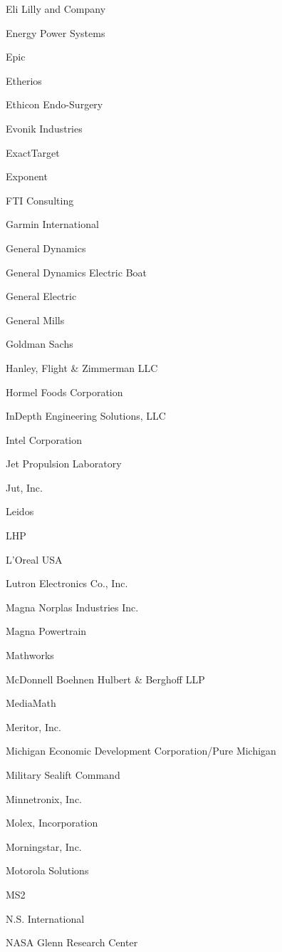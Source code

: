 \documentclass[twoside]{article}
\begin{document}
\begin{center}
\begin{multicols}{5}
\begin{FlushLeft}
\begin{compactitem}
\item Eli Lilly and Company
\item Energy Power Systems
\item Epic
\item Etherios
\item Ethicon Endo-Surgery
\item Evonik Industries
\item ExactTarget
\item Exponent
\item FTI Consulting
\item Garmin International
\item General Dynamics
\item General Dynamics Electric Boat
\item General Electric
\item General Mills
\item Goldman Sachs
\item Hanley, Flight \& Zimmerman LLC
\item Hormel Foods Corporation
\item InDepth Engineering Solutions, LLC
\item Intel Corporation
\item Jet Propulsion Laboratory
\item Jut, Inc.
\item Leidos
\item LHP
\item L'Oreal USA
\item Lutron Electronics Co., Inc.
\item Magna Norplas Industries Inc.
\item Magna Powertrain
\item Mathworks
\item McDonnell Boehnen Hulbert \& Berghoff LLP
\item MediaMath
\item Meritor, Inc.
\item Michigan Economic Development Corporation/Pure Michigan
\item Military Sealift Command
\item Minnetronix, Inc.
\item Molex, Incorporation
\item Morningstar, Inc.
\item Motorola Solutions
\item MS2
\item N.S. International
\item NASA Glenn Research Center

\end{compactitem}
\end{FlushLeft}
\end{multicols}
\end{center}
\end{document}
